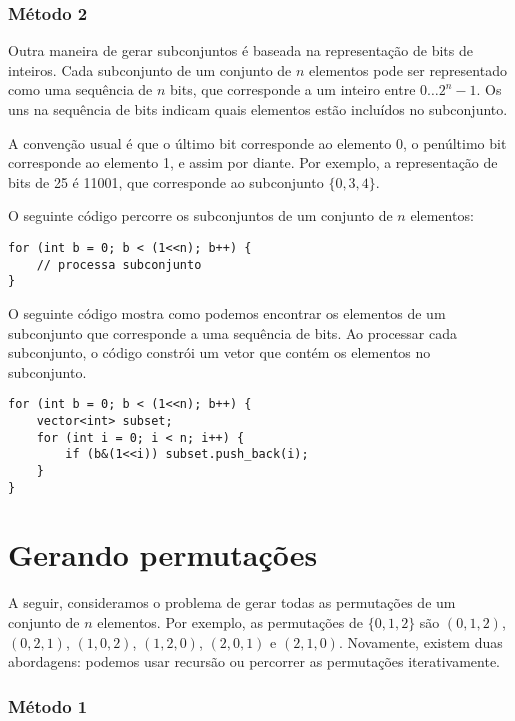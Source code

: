 \subsubsection{Método 2}

Outra maneira de gerar subconjuntos é baseada na
representação de bits de inteiros.
Cada subconjunto de um conjunto de $n$ elementos
pode ser representado como uma sequência de $n$ bits,
que corresponde a um inteiro entre $0 \ldots 2^n-1$.
Os uns na sequência de bits indicam
quais elementos estão incluídos no subconjunto.

A convenção usual é que
o último bit corresponde ao elemento 0,
o penúltimo bit corresponde ao elemento 1,
e assim por diante.
Por exemplo, a representação de bits de 25
é 11001, que corresponde ao subconjunto $\{0,3,4\}$.

O seguinte código percorre os subconjuntos
de um conjunto de $n$ elementos:

\begin{lstlisting}
for (int b = 0; b < (1<<n); b++) {
    // processa subconjunto
}
\end{lstlisting}

O seguinte código mostra como podemos encontrar
os elementos de um subconjunto que corresponde a uma sequência de bits.
Ao processar cada subconjunto,
o código constrói um vetor que contém os
elementos no subconjunto.

\begin{lstlisting}
for (int b = 0; b < (1<<n); b++) {
    vector<int> subset;
    for (int i = 0; i < n; i++) {
        if (b&(1<<i)) subset.push_back(i);
    }
}
\end{lstlisting}

\section{Gerando permutações}


A seguir, consideramos o problema de gerar
todas as permutações de um conjunto de $n$ elementos.
Por exemplo, as permutações de $\{0,1,2\}$ são
$(0,1,2)$, $(0,2,1)$, $(1,0,2)$, $(1,2,0)$,
$(2,0,1)$ e $(2,1,0)$.
Novamente, existem duas abordagens:
podemos usar recursão ou percorrer as
permutações iterativamente.

\subsubsection{Método 1}

